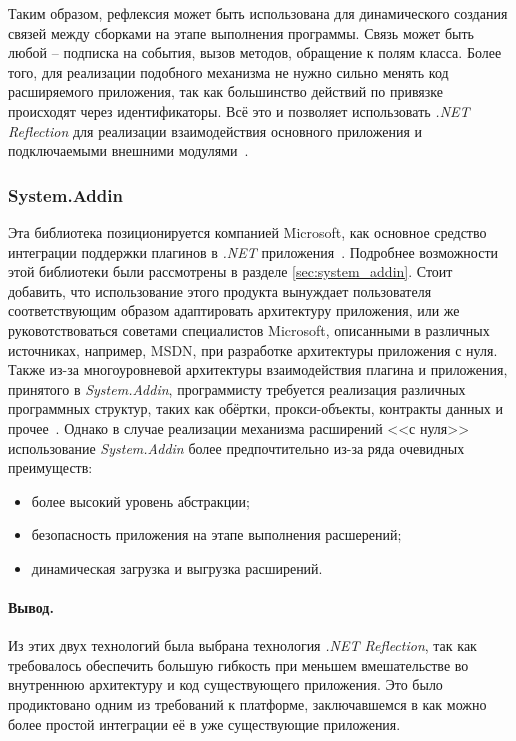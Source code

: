 Таким образом, рефлексия может быть использована для динамического создания связей между сборками на этапе выполнения программы. Связь может быть любой – подписка на события, вызов методов, обращение к полям класса. Более того, для реализации подобного механизма не нужно сильно менять код расширяемого приложения, так как большинство действий по привязке происходят через идентификаторы. Всё это и позволяет использовать {\it .NET Reflection} для реализации взаимодействия основного приложения и подключаемыми внешними модулями~\cite{addins2-article}.

\subsubsection{System.Addin}

Эта библиотека позиционируется компанией Microsoft, как основное средство интеграции поддержки плагинов в {\it .NET} приложения~\cite{addins1-article, dotnet-app-extensibility}. Подробнее возможности этой библиотеки были рассмотрены в разделе \ref{sec:system_addin}. Стоит добавить, что использование этого продукта вынуждает пользователя соответствующим образом адаптировать архитектуру приложения, или же руковотствоваться советами специалистов Microsoft, описанными в различных источниках, например, MSDN, при разработке архитектуры приложения с нуля. Также из-за многоуровневой архитектуры взаимодействия плагина и приложения, принятого в {\it System.Addin}, программисту требуется реализация различных программных структур, таких как обёртки, прокси-объекты, контракты данных и прочее~\cite{use-systemaddin-namespace}. Однако в случае реализации механизма расширений <<с нуля>> использование {\it System.Addin} более предпочтительно из-за ряда очевидных преимуществ:

\begin{itemize}
  \item более высокий уровень абстракции;
  \item безопасность приложения на этапе выполнения расшерений;
  \item динамическая загрузка и выгрузка расширений.
\end{itemize}

\paragraph{Вывод.}

Из этих двух технологий была выбрана технология {\it .NET Reflection}, так как требовалось обеспечить большую гибкость при меньшем вмешательстве во внутреннюю архитектуру и код существующего приложения. Это было продиктовано одним из требований к платформе, заключавшемся в как можно более простой интеграции её в уже существующие приложения.

